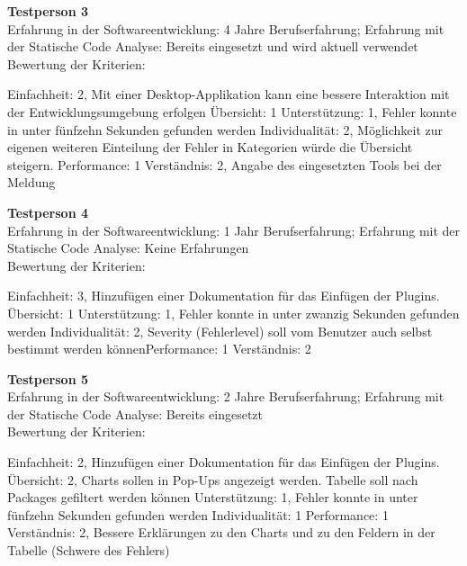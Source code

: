 \textbf{Testperson 3} \\
Erfahrung in der Softwareentwicklung: 4 Jahre Berufserfahrung; Erfahrung mit der Statische Code Analyse: Bereits eingesetzt und wird aktuell verwendet\\
Bewertung der Kriterien:

Einfachheit: 2, Mit einer Desktop-Applikation kann eine bessere Interaktion mit der Entwicklungsumgebung erfolgen \newline Übersicht: 1 \newline  Unterstützung: 1, Fehler konnte in unter fünfzehn Sekunden gefunden werden \newline Individualität: 2, Möglichkeit zur eigenen weiteren Einteilung der Fehler in Kategorien würde die Übersicht steigern.  \newline Performance: 1 \newline  Verständnis: 2, Angabe des eingesetzten Tools bei der Meldung\newline 

\textbf{Testperson 4} \\
Erfahrung in der Softwareentwicklung: 1 Jahr Berufserfahrung; Erfahrung mit der Statische Code Analyse: Keine Erfahrungen\\
Bewertung der Kriterien:

Einfachheit: 3, Hinzufügen einer Dokumentation für das Einfügen der Plugins.  \newline Übersicht: 1 \newline  Unterstützung: 1, Fehler konnte in unter zwanzig Sekunden gefunden werden \newline Individualität: 2, Severity (Fehlerlevel) soll vom Benutzer auch selbst bestimmt werden können\newline Performance: 1 \newline  Verständnis: 2\newline 

\textbf{Testperson 5} \\
Erfahrung in der Softwareentwicklung: 2 Jahre Berufserfahrung; Erfahrung mit der Statische Code Analyse: Bereits eingesetzt\\
Bewertung der Kriterien:

Einfachheit: 2, Hinzufügen einer Dokumentation für das Einfügen der Plugins.  \newline Übersicht: 2, Charts sollen in Pop-Ups angezeigt werden. Tabelle soll nach Packages gefiltert werden können \newline  Unterstützung: 1, Fehler konnte in unter fünfzehn Sekunden gefunden werden \newline Individualität: 1 \newline Performance: 1 \newline  Verständnis: 2, Bessere Erklärungen zu den Charts und zu den Feldern in der Tabelle (Schwere des Fehlers)\newline 

